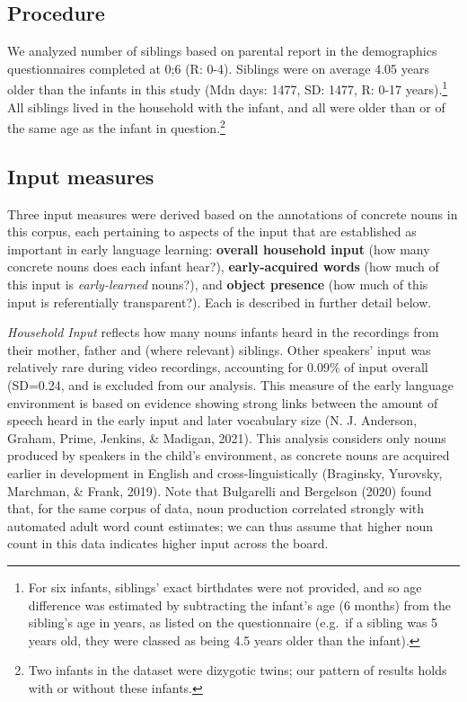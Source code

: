 \documentclass[
  english,
  man,floatsintext]{apa6}
\begin{document}
\hypertarget{procedure}{%
\subsection{Procedure}\label{procedure}}

We analyzed number of siblings based on parental report in the demographics questionnaires completed at 0;6 (R: 0-4). Siblings were on average 4.05 years older than the infants in this study (Mdn days: 1477, SD: 1477, R: 0-17 years).\footnote{For six infants, siblings' exact birthdates were not provided, and so age difference was estimated by subtracting the infant's age (6 months) from the sibling's age in years, as listed on the questionnaire (e.g.~if a sibling was 5 years old, they were classed as being 4.5 years older than the infant).} All siblings lived in the household with the infant, and all were older than or of the same age as the infant in question.\footnote{Two infants in the dataset were dizygotic twins; our pattern of results holds with or without these infants.}

\hypertarget{input-measures}{%
\subsection{Input measures}\label{input-measures}}

Three input measures were derived based on the annotations of concrete nouns in this corpus, each pertaining to aspects of the input that are established as important in early language learning: \textbf{overall household input} (how many concrete nouns does each infant hear?), \textbf{early-acquired words} (how much of this input is \emph{early-learned} nouns?), and \textbf{object presence} (how much of this input is referentially transparent?). Each is described in further detail below.

\emph{Household Input} reflects how many nouns infants heard in the recordings from their mother, father and (where relevant) siblings. Other speakers' input was relatively rare during video recordings, accounting for 0.09\% of input overall (SD=0.24, and is excluded from our analysis. This measure of the early language environment is based on evidence showing strong links between the amount of speech heard in the early input and later vocabulary size (N. J. Anderson, Graham, Prime, Jenkins, \& Madigan, 2021). This analysis considers only nouns produced by speakers in the child's environment, as concrete nouns are acquired earlier in development in English and cross-linguistically (Braginsky, Yurovsky, Marchman, \& Frank, 2019). Note that Bulgarelli and Bergelson (2020) found that, for the same corpus of data, noun production correlated strongly with automated adult word count estimates; we can thus assume that higher noun count in this data indicates higher input across the board.
\end{document}
